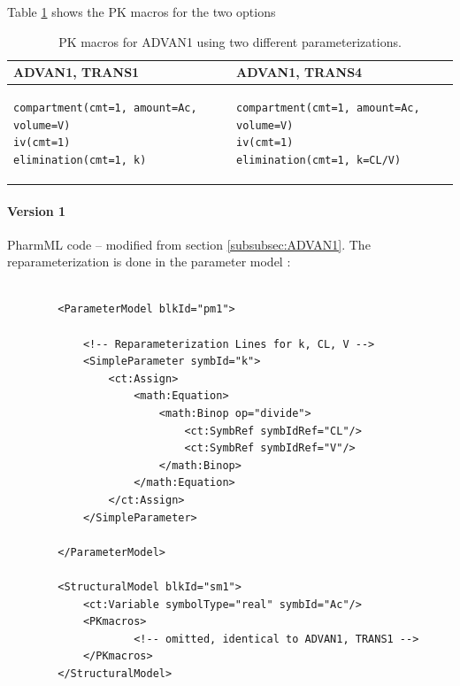 Table \ref{tab:ADVAN1TRANS1reparameterisation} shows the PK macros for the two options
\begin{table}[ht]
\begin{center}
\begin{tabular*}{.8\textwidth}{@{\extracolsep{\fill} } ll}
  \hline
  \hline
ADVAN1, TRANS1 & ADVAN1, TRANS4 \\
  \hline
\lstset{language=NONMEMdataSet}
\begin{lstlisting}
compartment(cmt=1, amount=Ac, volume=V)
iv(cmt=1)
elimination(cmt=1, k)
\end{lstlisting}
&
\lstset{language=NONMEMdataSet}
\begin{lstlisting}
compartment(cmt=1, amount=Ac, volume=V)
iv(cmt=1)
elimination(cmt=1, k=CL/V)
\end{lstlisting}

\end{tabular*}
\caption{PK macros for ADVAN1 using two different parameterizations.}
\label{tab:ADVAN1TRANS1reparameterisation}
\end{center}
\end{table}

\paragraph{Version 1}
PharmML code -- modified from section \ref{subsubsec:ADVAN1}. The reparameterization is done in 
the parameter model :
\lstset{language=XML}
\begin{lstlisting}

        <ParameterModel blkId="pm1">
            
            <!-- Reparameterization Lines for k, CL, V -->
            <SimpleParameter symbId="k">
                <ct:Assign>
                    <math:Equation>
                        <math:Binop op="divide">
                            <ct:SymbRef symbIdRef="CL"/>
                            <ct:SymbRef symbIdRef="V"/>
                        </math:Binop>
                    </math:Equation>
                </ct:Assign>
            </SimpleParameter>
            
        </ParameterModel>

        <StructuralModel blkId="sm1">
            <ct:Variable symbolType="real" symbId="Ac"/>
            <PKmacros>
                    <!-- omitted, identical to ADVAN1, TRANS1 -->
            </PKmacros>
        </StructuralModel>
\end{lstlisting}

